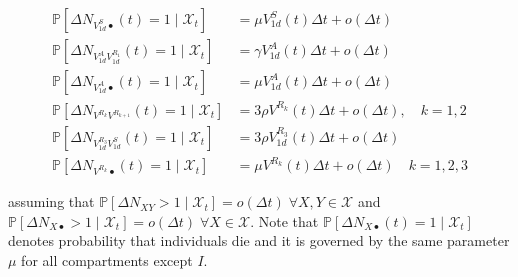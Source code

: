 \begin{fullwidth}
\begin{align}
    \mathbb{P}\left[ \Delta N_{V_{1d}^S\bullet}(t) = 1 \mid\mathcal{X}_t\right] &= \mu  V_{1d}^S(t) \Delta t + o(\Delta t)\\
    \mathbb{P}\left[ \Delta N_{V_{1d}^AV_{1d}^{R_1}}(t) = 1 \mid\mathcal{X}_t\right] &= \gamma V_{1d}^A(t) \Delta t + o(\Delta t)\\
    \mathbb{P}\left[ \Delta N_{V_{1d}^A\bullet}(t) = 1 \mid\mathcal{X}_t\right] &= \mu  V_{1d}^A(t) \Delta t + o(\Delta t)\\
    \mathbb{P}\left[ \Delta N_{V^{R_k}V^{R_{k+1}}}(t) = 1 \mid\mathcal{X}_t\right] &= 3\rho V^{R_k}(t) \Delta t + o(\Delta t),\quad k=1,2\\
    \mathbb{P}\left[ \Delta N_{V_{1d}^{R_3}V_{1d}^S}(t) = 1 \mid\mathcal{X}_t\right] &= 3\rho V_{1d}^{R_3}(t) \Delta t + o(\Delta t)\\
    \mathbb{P}\left[ \Delta N_{V^{R_k}\bullet}(t) = 1 \mid\mathcal{X}_t\right] &= \mu  V^{R_k}(t) \Delta t + o(\Delta t)\quad k=1,2,3 \label{eq:stochend}
\end{align}
\endgroup
\end{fullwidth}
assuming that \(\mathbb{P}[\Delta N_{XY} > 1\mid\mathcal{X}_t] = o(\Delta t) \; \forall X,Y \in \mathcal{X}\) and \(\mathbb{P}[\Delta N_{X\bullet} > 1\mid\mathcal{X}_t] = o(\Delta t) \; \forall X \in \mathcal{X}\). Note that \(\mathbb{P}\left[ \Delta N_{X\bullet}(t) = 1 \mid\mathcal{X}_t\right]\) denotes probability that individuals die and it is governed by the same parameter $\mu$ for all compartments except $I$. 

